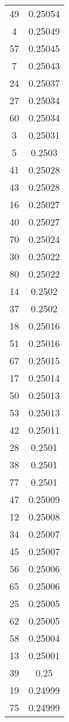 \documentclass{article}
\begin{document}
\vspace{10cm}

\twocolumn
\centering
{}
\begin{supertabular}{cc}
\toprule
\midrule

49 & 0.25054 \\
4 & 0.25049 \\
57 & 0.25045 \\
7 & 0.25043 \\
24 & 0.25037 \\
27 & 0.25034 \\
60 & 0.25034 \\
3 & 0.25031 \\
5 & 0.2503 \\
41 & 0.25028 \\
43 & 0.25028 \\
16 & 0.25027 \\
40 & 0.25027 \\
70 & 0.25024 \\
30 & 0.25022 \\
80 & 0.25022 \\
14 & 0.2502 \\
37 & 0.2502 \\
18 & 0.25016 \\
51 & 0.25016 \\
67 & 0.25015 \\
17 & 0.25014 \\
50 & 0.25013 \\
53 & 0.25013 \\
42 & 0.25011 \\
28 & 0.2501 \\
38 & 0.2501 \\
77 & 0.2501 \\
47 & 0.25009 \\
12 & 0.25008 \\
34 & 0.25007 \\
45 & 0.25007 \\
56 & 0.25006 \\
65 & 0.25006 \\
25 & 0.25005 \\
62 & 0.25005 \\
58 & 0.25004 \\
13 & 0.25001 \\
39 & 0.25 \\
19 & 0.24999 \\
75 & 0.24999 \\

\end{supertabular}
\end{document}
